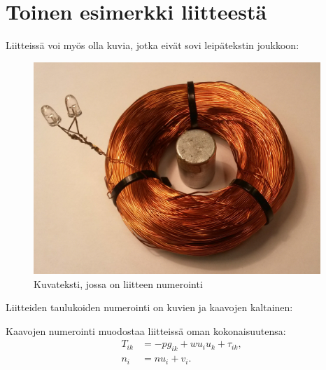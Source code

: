 \documentclass[english, 12pt, a4paper, sci, utf8, a-1b, online]{aaltothesis}
\begin{document}
\clearpage
\section{Toinen esimerkki liitteestä\label{LiiteB}}


Liitteissä voi myös olla kuvia, jotka
eivät sovi leipätekstin joukkoon:
\begin{figure}[htb]
	\centering
	\includegraphics[height=8cm]{./ledspole.jpg}
	\caption{Kuvateksti, jossa on liitteen numerointi}
	\label{liitekuva}
\end{figure}
Liitteiden taulukoiden numerointi on kuvien ja kaavojen kaltainen:
\begin{table}[htb]
\caption{Taulukon kuvateksti.}
\label{liitetaulukko}
\centering
{}
\end{table}
Kaavojen numerointi muodostaa liitteissä oman kokonaisuutensa:
\begin{align}
T_{ik} &= -p g_{ik} + w u_i u_k + \tau_{ik},  \label{liitekaava3} \\
n_i    &= n u_i + v_i.                      \label{liitekaava4}
\end{align}
\end{document}
